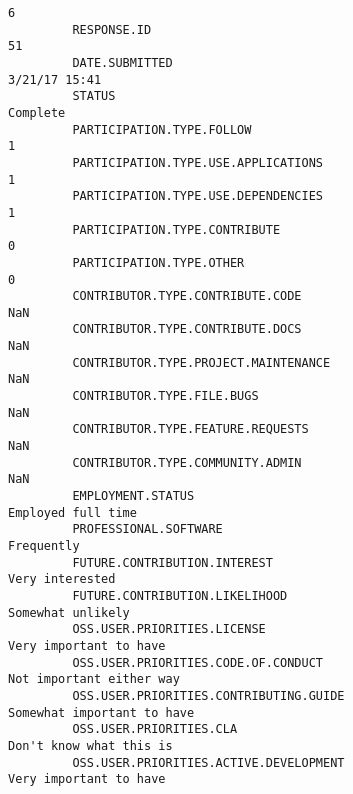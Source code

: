 \documentclass[11pt]{article}
\begin{document}
\begin{Verbatim}[commandchars=\\\{\}]
                                                                                                            6  
         RESPONSE.ID                                                                                       51  
         DATE.SUBMITTED                                                                         3/21/17 15:41  
         STATUS                                                                                      Complete  
         PARTICIPATION.TYPE.FOLLOW                                                                          1  
         PARTICIPATION.TYPE.USE.APPLICATIONS                                                                1  
         PARTICIPATION.TYPE.USE.DEPENDENCIES                                                                1  
         PARTICIPATION.TYPE.CONTRIBUTE                                                                      0  
         PARTICIPATION.TYPE.OTHER                                                                           0  
         CONTRIBUTOR.TYPE.CONTRIBUTE.CODE                                                                 NaN  
         CONTRIBUTOR.TYPE.CONTRIBUTE.DOCS                                                                 NaN  
         CONTRIBUTOR.TYPE.PROJECT.MAINTENANCE                                                             NaN  
         CONTRIBUTOR.TYPE.FILE.BUGS                                                                       NaN  
         CONTRIBUTOR.TYPE.FEATURE.REQUESTS                                                                NaN  
         CONTRIBUTOR.TYPE.COMMUNITY.ADMIN                                                                 NaN  
         EMPLOYMENT.STATUS                                                                 Employed full time  
         PROFESSIONAL.SOFTWARE                                                                     Frequently  
         FUTURE.CONTRIBUTION.INTEREST                                                         Very interested  
         FUTURE.CONTRIBUTION.LIKELIHOOD                                                     Somewhat unlikely  
         OSS.USER.PRIORITIES.LICENSE                                                   Very important to have  
         OSS.USER.PRIORITIES.CODE.OF.CONDUCT                                         Not important either way  
         OSS.USER.PRIORITIES.CONTRIBUTING.GUIDE                                    Somewhat important to have  
         OSS.USER.PRIORITIES.CLA                                                      Don't know what this is  
         OSS.USER.PRIORITIES.ACTIVE.DEVELOPMENT                                        Very important to have  

\end{Verbatim}
\end{document}
